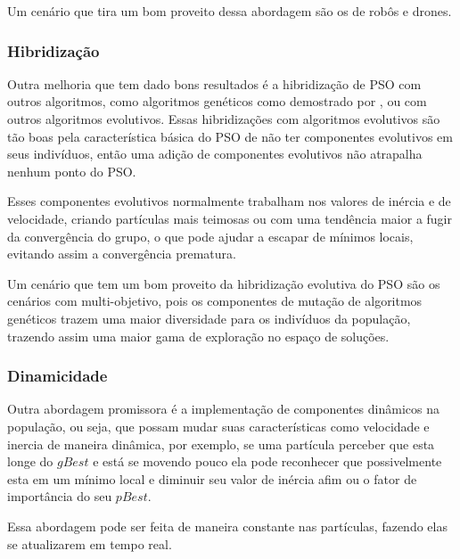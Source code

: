             Um cenário que tira um bom proveito dessa abordagem são os de robôs e drones.            

        \subsubsection{Hibridização}
            Outra melhoria que tem dado bons resultados é a hibridização de PSO com outros algoritmos, como algoritmos genéticos como demostrado por \cite{carvalho2014}, ou com outros algoritmos evolutivos.\newline
            Essas hibridizações com algoritmos evolutivos são tão boas pela característica básica do PSO de não ter componentes evolutivos em seus indivíduos, então uma adição de componentes evolutivos não atrapalha nenhum ponto do PSO. \newline
            
            Esses componentes evolutivos normalmente trabalham nos valores de inércia e de velocidade, criando partículas mais teimosas ou com uma tendência maior a fugir da convergência do grupo, o que pode ajudar a escapar de mínimos locais, evitando assim a convergência prematura.\newline
            
            Um cenário que tem um bom proveito da hibridização evolutiva do PSO são os cenários com multi-objetivo, pois os componentes de mutação de algoritmos genéticos trazem uma maior diversidade para os indivíduos da população, trazendo assim uma maior gama de exploração no espaço de soluções.

        \subsubsection{Dinamicidade}
            Outra abordagem promissora é a implementação de componentes dinâmicos na população, ou seja, que possam mudar suas características como velocidade e inercia de maneira dinâmica, por exemplo, se uma partícula perceber que esta longe do $gBest$ e está se movendo pouco ela pode reconhecer que possivelmente esta em um mínimo local e diminuir seu valor de inércia afim ou o fator de importância do seu $pBest$.\newline
            
            Essa abordagem pode ser feita de maneira constante nas partículas, fazendo elas se atualizarem em tempo real.

